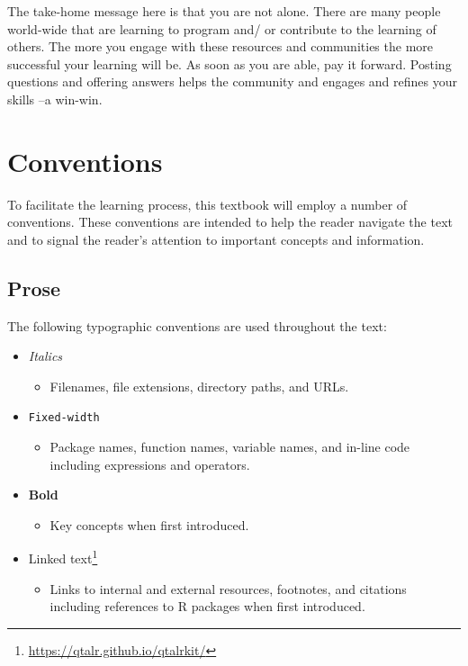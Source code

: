 \documentclass[
  letterpaper,
  DIV=11,
  numbers=noendperiod]{scrreport}
\providecommand{\tightlist}{%
  \setlength{\itemsep}{0pt}\setlength{\parskip}{0pt}}\usepackage{longtable,booktabs,array}
\theoremstyle{definition}
\theoremstyle{remark}
\DeclareRobustCommand{\href}[2]{#2\footnote{\url{#1}}}
\begin{document}
The take-home message here is that you are not alone. There are many
people world-wide that are learning to program and/ or contribute to the
learning of others. The more you engage with these resources and
communities the more successful your learning will be. As soon as you
are able, pay it forward. Posting questions and offering answers helps
the community and engages and refines your skills --a win-win.

\hypertarget{sec-p-conventions}{%
\section*{Conventions}\label{sec-p-conventions}}


To facilitate the learning process, this textbook will employ a number
of conventions. These conventions are intended to help the reader
navigate the text and to signal the reader's attention to important
concepts and information.

\hypertarget{sec-p-prose}{%
\subsection*{Prose}\label{sec-p-prose}}

The following typographic conventions are used throughout the text:

\begin{itemize}
\tightlist
\item
  \emph{Italics}

  \begin{itemize}
  \tightlist
  \item
    Filenames, file extensions, directory paths, and URLs.
  \end{itemize}
\item
  \texttt{Fixed-width}

  \begin{itemize}
  \tightlist
  \item
    Package names, function names, variable names, and in-line code
    including expressions and operators.
  \end{itemize}
\item
  \textbf{Bold}

  \begin{itemize}
  \tightlist
  \item
    Key concepts when first introduced.
  \end{itemize}
\item
  \href{https://qtalr.github.io/qtalrkit/}{Linked text}

  \begin{itemize}
  \tightlist
  \item
    Links to internal and external resources, footnotes, and citations
    including references to R packages when first introduced.
  \end{itemize}
\end{itemize}
\end{document}
